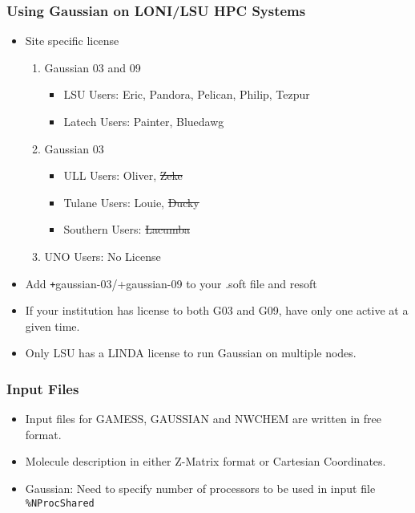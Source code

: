 \documentclass[slidestop,mathserif,compress,xcolor=svgnames]{beamer}
\newenvironment{eblock}[0]
{
\begin{beamerboxesrounded}[upper=uppercol2,lower=lowercol2,shadow=true]}
{\end{beamerboxesrounded}}
\begin{document}
\begin{frame}
  \frametitle{\small Using Gaussian on LONI/LSU HPC Systems}
  \begin{eblock}{}
  \begin{itemize}
    \item Site specific license%
    \begin{enumerate}
      \item {\color{tigersblue}Gaussian 03 and 09}
      \begin{itemize}
	\item {\color{tigersblue}LSU Users}: Eric, {\color{green!30!black}Pandora, Pelican, Philip, Tezpur}
	\item {\color{tigersblue}Latech Users}: Painter, Bluedawg
      \end{itemize}
      \item {\color{tigerspurple}Gaussian 03}
      \begin{itemize}
	\item {\color{tigerspurple}ULL Users}: Oliver, \sout{Zeke}
	\item {\color{tigerspurple}Tulane Users}: Louie, \sout{Ducky}
	\item {\color{tigerspurple}Southern Users}: \sout{Lacumba}
      \end{itemize}
      \item UNO Users: No License
    \end{enumerate}
    \item Add {\texttt +gaussian-03/+gaussian-09} to your .soft file and resoft
    \item \alert{If your institution has license to both G03 and G09, have only one active at a given time.}
    \item \alert{Only LSU has a LINDA license to run Gaussian on multiple nodes.}
  \end{itemize}
  \end{eblock}
\end{frame}

\begin{frame}
  \frametitle{\small Input Files}
  \begin{itemize}
    \item Input files for GAMESS, GAUSSIAN and NWCHEM are written in free format.
    \item Molecule description in either Z-Matrix format or Cartesian Coordinates.
    \item Gaussian: Need to specify number of processors to be used in input file \texttt{\%NProcShared}
  \end{itemize}
\end{frame}
\end{document}
